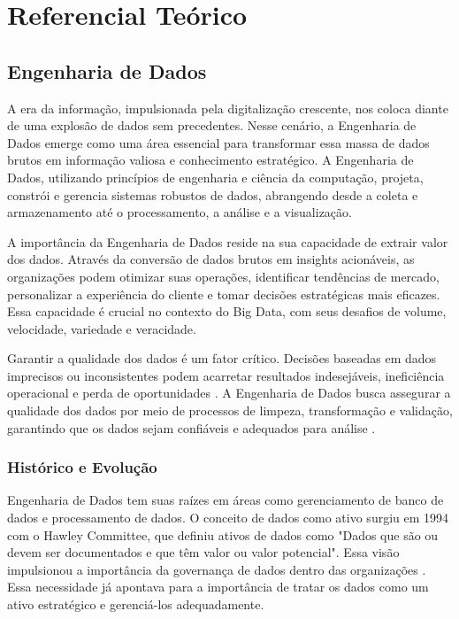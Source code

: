 
\chapter[Referencial Teórico]{Referencial Teórico}

\section{Engenharia de Dados}

A era da informação, impulsionada pela digitalização crescente, nos coloca diante de uma explosão 
de dados sem precedentes. Nesse cenário, a Engenharia de Dados emerge como uma área essencial
para transformar essa massa de dados brutos em informação valiosa e conhecimento estratégico. A 
Engenharia de Dados, utilizando princípios de engenharia e ciência da computação, projeta, constrói 
e gerencia sistemas robustos de dados, abrangendo desde a coleta e armazenamento até o processamento, a análise e a visualização.

A importância da Engenharia de Dados reside na sua capacidade de extrair valor dos dados. Através 
da conversão de dados brutos em insights acionáveis, as organizações podem otimizar suas operações, 
identificar tendências de mercado, personalizar a experiência do cliente e tomar decisões estratégicas 
mais eficazes. Essa capacidade é crucial no contexto do Big Data, com seus desafios de volume, 
velocidade, variedade e veracidade.

Garantir a qualidade dos dados é um fator crítico. Decisões baseadas em dados imprecisos ou 
inconsistentes podem acarretar resultados indesejáveis, ineficiência operacional e perda de 
oportunidades \cite{impact_poor_data_1998}. A Engenharia de Dados busca assegurar a qualidade dos dados por meio de processos 
de limpeza, transformação e validação, garantindo que os dados sejam confiáveis e adequados para análise \cite{haug2011costs}.

\subsection{Histórico e Evolução}
Engenharia de Dados tem suas raízes em áreas como
gerenciamento de banco de dados e processamento de dados. O conceito de dados como ativo surgiu em 1994 com o Hawley 
Committee, que definiu ativos de dados como "Dados que são ou devem ser documentados e que têm 
valor ou valor potencial". Essa visão impulsionou a importância da governança de dados dentro 
das organizações \cite{alhassan2016data}. Essa necessidade já apontava para a importância de tratar os dados como um ativo estratégico e gerenciá-los adequadamente.


